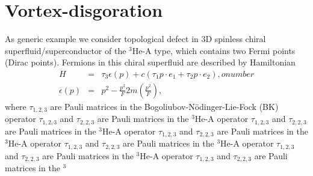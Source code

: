 \section{Vortex-disgoration}
As generic example we consider topological defect in 3D spinless chiral superfluid/superconductor of the $^3$He-A type, which contains two Fermi points (Dirac points). Fermions in this chiral superfluid are described by Hamiltonian
\begin{eqnarray}
H&=&\tau_3\epsilon(p)+c\left(\tau_1p\cdot e_1+\tau_2p\cdot e_2\right),
onumber\\
\epsilon(p)&=&p^2-\frac{p^2}{F}2m\left(\frac{p^2}{F}\right),
\end{eqnarray}
where $\tau_{1,2,3}$ are Pauli matrices in the Bogoliubov-N\"{o}dinger-Lie-Fock (BK) operator $\tau_{1,2,3}$ and $\tau_{2,2,3}$ are Pauli matrices in the $^3$He-A operator $\tau_{1,2,3}$ and $\tau_{2,2,3}$ are Pauli matrices in the $^3$He-A operator $\tau_{1,2,3}$ and $\tau_{2,2,3}$ are Pauli matrices in the $^3$He-A operator $\tau_{1,2,3}$ and $\tau_{2,2,3}$ are Pauli matrices in the $^3$He-A operator $\tau_{1,2,3}$ and $\tau_{2,2,3}$ are Pauli matrices in the $^3$He-A operator $\tau_{1,2,3}$ and $\tau_{2,2,3}$ are Pauli matrices in the $^3$
\importpackages{}
\graphicspath{ {./images/} }



